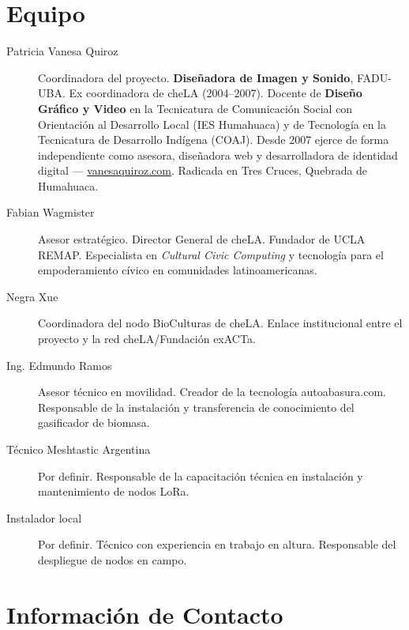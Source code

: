 \documentclass[12pt,a4paper]{article}
\begin{document}
\section{Equipo}

\begin{description}
  \item[Patricia Vanesa Quiroz] Coordinadora del proyecto. \textbf{Diseñadora de Imagen y Sonido}, FADU-UBA. Ex coordinadora de cheLA (2004--2007). Docente de \textbf{Diseño Gráfico y Video} en la Tecnicatura de Comunicación Social con Orientación al Desarrollo Local (IES Humahuaca) y de Tecnología en la Tecnicatura de Desarrollo Indígena (COAJ). Desde 2007 ejerce de forma independiente como asesora, diseñadora web y desarrolladora de identidad digital --- \href{https://vanesaquiroz.com}{vanesaquiroz.com}. Radicada en Tres Cruces, Quebrada de Humahuaca.

  \item[Fabian Wagmister] Asesor estratégico. Director General de cheLA. Fundador de UCLA REMAP. Especialista en \textit{Cultural Civic Computing} y tecnología para el empoderamiento cívico en comunidades latinoamericanas.

  \item[Negra Xue] Coordinadora del nodo BioCulturas de cheLA. Enlace institucional entre el proyecto y la red cheLA/Fundación exACTa.

  \item[Ing. Edmundo Ramos] Asesor técnico en movilidad. Creador de la tecnología autoabasura.com. Responsable de la instalación y transferencia de conocimiento del gasificador de biomasa.

  \item[Técnico Meshtastic Argentina] Por definir. Responsable de la capacitación técnica en instalación y mantenimiento de nodos LoRa.

  \item[Instalador local] Por definir. Técnico con experiencia en trabajo en altura. Responsable del despliegue de nodos en campo.
\end{description}

\section{Información de Contacto}
\end{document}
